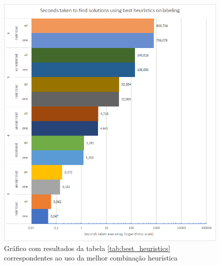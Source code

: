 \begin{figure}[ht]
\centering
\includegraphics[width=\textwidth]{figuras/graphs/best_heuristics.png}
\caption{Gráfico com resultados da tabela \ref{tab:best_heuristics} correspondentes ao uso da melhor combinação heurística}
\label{gph:best_heuristics}
\end{figure}